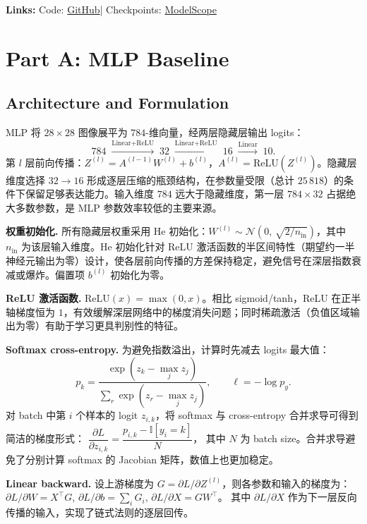 \documentclass[11pt,fontset=fandol]{ctexart}
\begin{document}
\noindent\textbf{Links:}\;
Code: \href{https://github.com/Parry-Git/Deep-Learning-Project1}{GitHub}\enspace|\enspace
Checkpoints: \href{https://modelscope.cn/models/ParryY/Deep-Learning-Project1}{ModelScope}

\section{Part A: MLP Baseline}

\subsection{Architecture and Formulation}

MLP 将 $28\times28$ 图像展平为 $784$-维向量，经两层隐藏层输出 logits：
\[
    784 \;\xrightarrow{\text{Linear+ReLU}}\; 32
    \;\xrightarrow{\text{Linear+ReLU}}\; 16
    \;\xrightarrow{\text{Linear}}\; 10.
\]
第 $l$ 层前向传播：$Z^{(l)} = A^{(l-1)} W^{(l)} + b^{(l)}$，$A^{(l)} = \mathrm{ReLU}(Z^{(l)})$。隐藏层维度选择 $32 \to 16$ 形成逐层压缩的瓶颈结构，在参数量受限（总计 $25\,818$）的条件下保留足够表达能力。输入维度 $784$ 远大于隐藏维度，第一层 $784 \times 32$ 占据绝大多数参数，是 MLP 参数效率较低的主要来源。

\smallskip\noindent\textbf{权重初始化.}\;
所有隐藏层权重采用 He 初始化：$W^{(l)} \sim \mathcal{N}\!\left(0,\, \sqrt{2 / n_\text{in}}\right)$，其中 $n_\text{in}$ 为该层输入维度。He 初始化针对 ReLU 激活函数的半区间特性（期望约一半神经元输出为零）设计，使各层前向传播的方差保持稳定，避免信号在深层指数衰减或爆炸。偏置项 $b^{(l)}$ 初始化为零。

\smallskip\noindent\textbf{ReLU 激活函数.}\;
$\mathrm{ReLU}(x) = \max(0, x)$。相比 sigmoid/tanh，ReLU 在正半轴梯度恒为 $1$，有效缓解深层网络中的梯度消失问题；同时稀疏激活（负值区域输出为零）有助于学习更具判别性的特征。

\smallskip\noindent\textbf{Softmax cross-entropy.}\;
为避免指数溢出，计算时先减去 logits 最大值：
\[
    p_k = \frac{\exp(z_k - \max_j z_j)}{\displaystyle\sum_{r} \exp(z_r - \max_j z_j)},
    \qquad
    \ell = -\log p_y.
\]
对 batch 中第 $i$ 个样本的 logit $z_{i,k}$，将 softmax 与 cross-entropy 合并求导可得到简洁的梯度形式：
$\dfrac{\partial L}{\partial z_{i,k}} = \dfrac{p_{i,k} - \mathbb{I}[y_i{=}k]}{N}$，
其中 $N$ 为 batch size。合并求导避免了分别计算 softmax 的 Jacobian 矩阵，数值上也更加稳定。

\smallskip\noindent\textbf{Linear backward.}\;
设上游梯度为 $G = \partial L / \partial Z^{(l)}$，则各参数和输入的梯度为：
$\partial L/\partial W = X^\top G$,\;
$\partial L/\partial b = \sum_i G_i$,\;
$\partial L/\partial X = G W^\top$。
其中 $\partial L/\partial X$ 作为下一层反向传播的输入，实现了链式法则的逐层回传。
\end{document}
